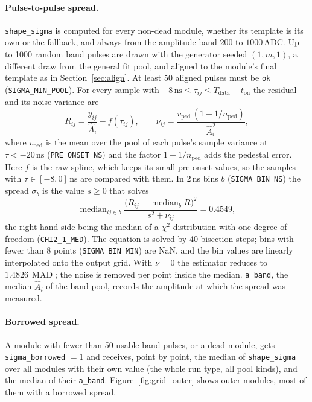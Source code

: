 \documentclass[11pt]{article}
\newcommand{\ns}{\,\mathrm{ns}}
\newcommand{\adc}{\,\mathrm{ADC}}
\newcommand{\code}[1]{\texttt{#1}}
\DeclareMathOperator{\median}{median}
\DeclareMathOperator{\MAD}{MAD}
\begin{document}
\paragraph{Pulse-to-pulse spread.} \code{shape\_sigma} is computed for every non-dead module, whether its template is its own or the fallback, and always from the amplitude band $200$ to $1000\adc$. Up to 1000 random band pulses are drawn with the generator seeded $(1, m, 1)$, a different draw from the general fit pool, and aligned to the module's final template as in Section~\ref{sec:align}. At least 50 aligned pulses must be \code{ok} (\code{SIGMA\_MIN\_POOL}). For every sample with $-8\ns \le \tau_{ij} \le T_{\mathrm{data}} - t_{\mathrm{on}}$ the residual and its noise variance are
\begin{equation}
R_{ij} = \frac{y_{ij}}{\hat A_i} - f(\tau_{ij}),
\qquad
\nu_{ij} = \frac{v_{\mathrm{ped}}\,(1 + 1/n_{\mathrm{ped}})}{\hat A_i^2},
\end{equation}
where $v_{\mathrm{ped}}$ is the mean over the pool of each pulse's sample variance at $\tau < -20\ns$ (\code{PRE\_ONSET\_NS}) and the factor $1 + 1/n_{\mathrm{ped}}$ adds the pedestal error. Here $f$ is the raw spline, which keeps its small pre-onset values, so the samples with $\tau \in [-8, 0]\ns$ are compared with them. In 2\,ns bins $b$ (\code{SIGMA\_BIN\_NS}) the spread $\sigma_b$ is the value $s \ge 0$ that solves
\begin{equation}
\median_{ij \in b} \frac{\big(R_{ij} - \median_b R\big)^2}{s^2 + \nu_{ij}} = 0.4549,
\label{eq:gsigma}
\end{equation}
the right-hand side being the median of a $\chi^2$ distribution with one degree of freedom (\code{CHI2\_1\_MED}). The equation is solved by 40 bisection steps; bins with fewer than 8 points (\code{SIGMA\_BIN\_MIN}) are NaN, and the bin values are linearly interpolated onto the output grid. With $\nu = 0$ the estimator reduces to $1.4826\,\MAD$; the noise is removed per point inside the median. \code{a\_band}, the median $\hat A_i$ of the band pool, records the amplitude at which the spread was measured.

\paragraph{Borrowed spread.} A module with fewer than 50 usable band pulses, or a dead module, gets \code{sigma\_borrowed} $= 1$ and receives, point by point, the median of \code{shape\_sigma} over all modules with their own value (the whole run type, all pool kinds), and the median of their \code{a\_band}. Figure~\ref{fig:grid_outer} shows outer modules, most of them with a borrowed spread.
\end{document}
